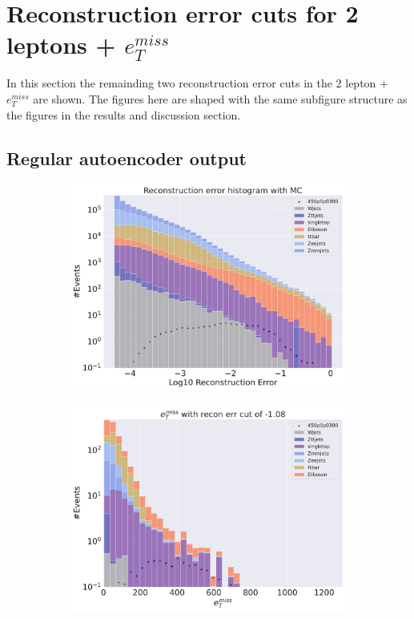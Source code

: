 \section{Reconstruction error cuts for 2 leptons + $e_T^{miss}$}

In this section the remainding two reconstruction error cuts in the 2 lepton + $e_T^{miss}$ are shown. 
The figures here are shaped with the same subfigure structure as the figures in the results and 
discussion section. 
\subsection*{Regular autoencoder output}



\begin{figure}[H]
    \centering
    \begin{subfigure}{.40\textwidth}
        \includegraphics[width=\textwidth]{Figures/AE_testing/small/2lep/b_data_recon_big_rm3_feats_sig_450p0p0300_.pdf}
        \caption{ }
        \label{fig:AE_2lep_big_450_2}
    \end{subfigure}
    \hfill
    \begin{subfigure}{.40\textwidth}
        \includegraphics[width=\textwidth]{Figures/AE_testing/big/2lep/b_data_recon_big_rm3_feats_sig_450p0p0300_recon_errcut_-1.08.pdf}

\end{subfigure}
\end{figure}

